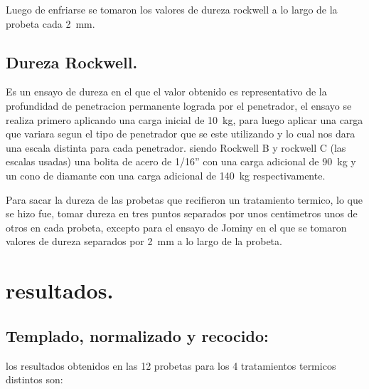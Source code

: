 \documentclass[12pt,a4paper]{article}
\begin{document}
Luego de enfriarse se tomaron los valores de dureza rockwell a lo largo de la probeta cada \SI{2}{\milli\meter}.

\subsection{Dureza Rockwell.}
Es un ensayo de dureza en el que el valor obtenido es representativo de la profundidad de penetracion permanente lograda por el penetrador, el ensayo se realiza primero aplicando una carga inicial de \SI{10}{\kilogram}, para luego aplicar una carga que variara segun el tipo de penetrador que se este utilizando y lo cual nos dara una escala distinta para cada penetrador. siendo Rockwell B y rockwell C (las escalas usadas) una bolita de acero de 1/16'' con una carga adicional de \SI{90}{\kilogram} y un cono de diamante con una carga adicional de \SI{140}{\kilogram} respectivamente.

Para sacar la dureza de las probetas que recifieron un tratamiento termico, lo que se hizo fue, tomar dureza en tres puntos separados por unos centimetros unos de otros en cada probeta, excepto para el ensayo de Jominy en el que se tomaron valores de dureza separados por \SI{2}{\milli\meter} a lo largo de la probeta.

\section{resultados.}

\subsection{Templado, normalizado y recocido:}

los resultados obtenidos en las 12 probetas para los 4 tratamientos termicos distintos son:
\end{document}
